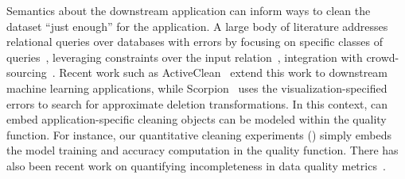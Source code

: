

  Semantics about the downstream application can inform ways to clean the dataset ``just enough'' for the application.  
A large body of literature addresses relational queries over databases with errors by focusing on specific classes of queries~\cite{altwaijry2015query}, leveraging constraints over the input relation~\cite{2011Bertossi}, integration with crowd-sourcing~\cite{DBLP:conf/sigmod/BergmanMNT15}.   Recent work such as ActiveClean~\cite{DBLP:journals/pvldb/KrishnanWWFG16} extend this work to downstream machine learning applications, while Scorpion~\cite{DBLP:journals/pvldb/0002M13} uses the visualization-specified errors to search for approximate deletion transformations.   In this context, \sys can embed application-specific cleaning objects can be modeled within the quality function.  For instance, our quantitative cleaning experiments () simply embeds the model training and accuracy computation in the quality function. 
There has also been recent work on quantifying incompleteness in data quality metrics~\cite{chung2016data}.


